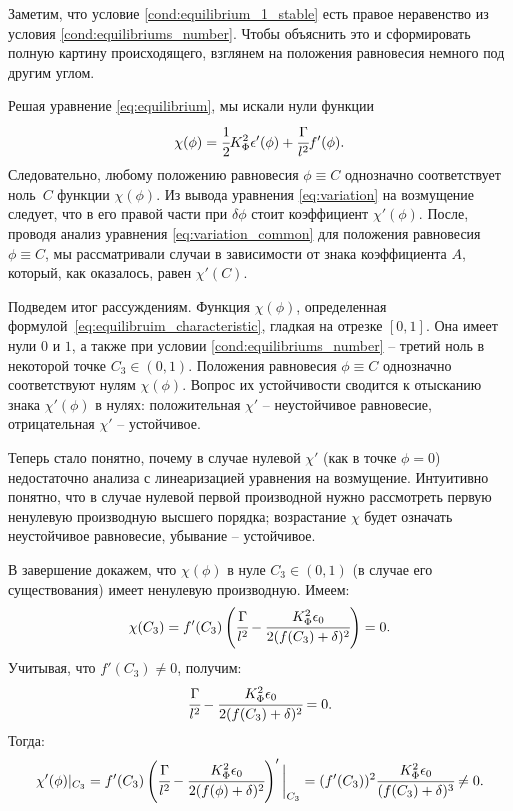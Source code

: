 Заметим, что условие \eqref{cond:equilibrium_1_stable} есть правое неравенство из условия \eqref{cond:equilibriums_number}. Чтобы объяснить это и сформировать полную картину происходящего, взглянем на положения равновесия немного под другим углом.

Решая уравнение \eqref{eq:equilibrium}, мы искали нули функции 
\begin{equation}
	\chi(\phi) = \cfrac{1}{2} K_\Phi^2 \epsilon'(\phi) + \cfrac{\Gamma}{l^2} f'(\phi) {\text{.}}
	\label{eq:equilibruim_characteristic}
\end{equation}
Следовательно, любому положению равновесия $\phi \equiv C$ однозначно соответствует ноль~$C$ функции $\chi(\phi)$. Из вывода уравнения \eqref{eq:variation} на возмущение следует, что в его правой части при $\delta \phi$ стоит коэффициент $\chi'(\phi)$. После, проводя анализ уравнения \eqref{eq:variation_common} для положения равновесия $\phi \equiv C$, мы рассматривали случаи в зависимости от знака коэффициента $A$, который, как оказалось, равен $\chi'(C)$.

Подведем итог рассуждениям. Функция $\chi(\phi)$, определенная форму\forcehyphenation лой~\eqref{eq:equilibruim_characteristic}, гладкая на отрезке $[0, 1]$. Она имеет нули $0$ и $1$, а также при условии \eqref{cond:equilibriums_number} -- третий ноль в некоторой точке $C_3 \in (0, 1)$. Положения равновесия $\phi \equiv C$ однозначно соответствуют нулям $\chi(\phi)$. Вопрос их устойчивости сводится к отысканию знака $\chi'(\phi)$ в нулях: положительная $\chi'$ -- неустойчивое равновесие, отрицательная $\chi'$ -- устойчивое.

Теперь стало понятно, почему в случае нулевой $\chi'$ (как в точке $\phi = 0$) недостаточно анализа с линеаризацией уравнения на возмущение. Интуитивно понятно, что в случае нулевой первой производной нужно рассмотреть первую ненулевую производную высшего порядка; возрастание $\chi$ будет означать неустойчивое равновесие, убывание -- устойчивое.

В завершение докажем, что $\chi(\phi)$ в нуле $C_3 \in (0, 1)$ (в случае его существования) имеет ненулевую производную. Имеем:
$$\chi(C_3) = f'(C_3) \left( \cfrac{\Gamma}{l^2} - \cfrac{K_\Phi^2 \epsilon_0}{2 (f(C_3) + \delta)^2} \right) = 0 {\text{.}}$$
Учитывая, что $f'(C_3) \ne 0$, получим:
$$\cfrac{\Gamma}{l^2} - \cfrac{K_\Phi^2 \epsilon_0}{2 (f(C_3) + \delta)^2} = 0 {\text{.}}$$
Тогда:
$$\chi'(\phi)|_{C_3} = f'(C_3) \left( \cfrac{\Gamma}{l^2} - \cfrac{K_\Phi^2 \epsilon_0}{2 (f(\phi) + \delta)^2} \right) ' \bigg|_{C_3} = (f'(C_3))^2 \cfrac{K_\Phi^2 \epsilon_0}{(f(C_3) + \delta)^3} \ne 0 {\text{.}}$$

